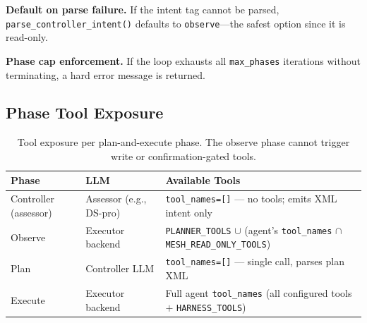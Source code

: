 \documentclass[11pt,letterpaper]{report}
\newcommand{\code}[1]{\texttt{#1}}
\begin{document}
\noindent\textbf{Default on parse failure.}
If the intent tag cannot be parsed, \code{parse\_controller\_intent()}
defaults to \code{observe}---the safest option since it is
read-only.

\noindent\textbf{Phase cap enforcement.}
If the loop exhausts all \code{max\_phases} iterations without
terminating, a hard error message is returned.

\subsection{Phase Tool Exposure}

\begin{table}[h]
\centering
\small
\begin{tabular}{@{}llL{6cm}@{}}
\toprule
\textbf{Phase} & \textbf{LLM} & \textbf{Available Tools} \\
\midrule
Controller (assessor)
  & Assessor (e.g., DS-pro)
  & \code{tool\_names=[]} --- no tools; emits XML intent only \\
\addlinespace
Observe
  & Executor backend
  & \code{PLANNER\_TOOLS} $\cup$
    (agent's \code{tool\_names} $\cap$
    \code{MESH\_READ\_ONLY\_TOOLS}) \\
\addlinespace
Plan
  & Controller LLM
  & \code{tool\_names=[]} --- single call, parses plan XML \\
\addlinespace
Execute
  & Executor backend
  & Full agent \code{tool\_names}
    (all configured tools $+$ \code{HARNESS\_TOOLS}) \\
\bottomrule
\end{tabular}
\caption{Tool exposure per plan-and-execute phase. The observe phase
cannot trigger write or confirmation-gated tools.}
\label{tab:phase-tools}
\end{table}
\end{document}
